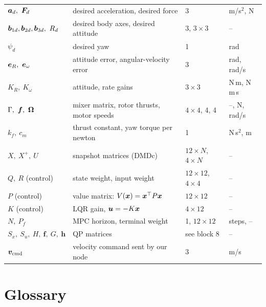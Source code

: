 \begin{center}
\begin{tabularx}{\linewidth}{@{}l X l l@{}}
$\va_d,\ \vF_d$ & desired acceleration, desired force & 3 & m/s$^2$, N\\
$\bm{b}_{1d},\bm{b}_{2d},\bm{b}_{3d},\ R_d$ & desired body axes, desired attitude & 3, $3\times3$ & --\\
$\psi_d$ & desired yaw & 1 & rad\\
$\ve_R,\ \ve_\omega$ & attitude error, angular-velocity error & 3 & rad, rad/s\\
$K_R,\ K_\omega$ & attitude, rate gains & $3\times3$ & N\,m, N\,m\,s\\
$\Gamma,\ \vf,\ \vOmega$ & mixer matrix, rotor thrusts, motor speeds & $4\times4$, 4, 4 & --, N, rad/s\\
$k_f,\ c_m$ & thrust constant, yaw torque per newton & 1 & N\,s$^2$, m\\
$X,\ X^+,\ U$ & snapshot matrices (DMDc) & $12\times N$, $4\times N$ & --\\
$Q,\ R$ (control) & state weight, input weight & $12\times12$, $4\times4$ & --\\
$P$ (control) & value matrix: $V(\bm{x})=\bm{x}^\top P\bm{x}$ & $12\times12$ & --\\
$K$ (control) & LQR gain, $\bm{u}=-K\bm{x}$ & $4\times12$ & --\\
$N,\ P_f$ & MPC horizon, terminal weight & 1, $12\times12$ & steps, --\\
$S_x,\ S_u,\ H,\ \bm f,\ G,\ \bm h$ & QP matrices & see block 8 & --\\
$\bm{v}_{\text{cmd}}$ & velocity command sent by our node & 3 & m/s\\
\bottomrule
\end{tabularx}
\end{center}

\section{Glossary}

